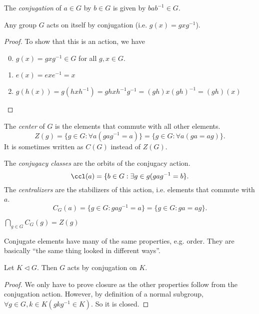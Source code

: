 \documentclass[a4pape]{article}
\begin{document}
\begin{defi}
  The \emph{conjugation} of $a\in G$ by $b\in G$ is given by $bab^{-1}\in G$.
\end{defi}

\begin{lemma}
  Any group $G$ acts on itself by conjugation (i.e. $g(x) = gxg^{-1}$).
\end{lemma}

\begin{proof}
  To show that this is an action, we have
  \begin{enumerate}[label=\arabic{*}.]
    \setcounter{enumi}{-1}
  \item $g(x) = gxg^{-1} \in G$ for all $g, x\in G$.
  \item $e(x) = exe^{-1} = x$
  \item $g(h(x)) = g(hxh^{-1}) = ghxh^{-1}g^{-1} = (gh)x(gh)^{-1} = (gh)(x)$
  \end{enumerate}
\end{proof}

\begin{defi}
  The \emph{center} of $G$ is the elements that commute with all other elements.
  \[
  Z(g) = \{g\in G: \forall a(gag^{-1} = a)\} = \{g\in G: \forall a(ga = ag)\}.
  \]
It is sometimes written as $C(G)$ instead of $Z(G)$.
\end{defi}

\begin{defi}
  The \emph{conjugacy classes} are the orbits of the conjugacy action.
  \[
  \ccl(a) = \{b\in G: \exists g\in g(gag^{-1} = b\}.
  \]
  The \emph{centralizers} are the stabilizers of this action, i.e. elements that commute with $a$.
  \[
  C_G(a) = \{g\in G: gag^{-1} = a\} = \{g\in G: ga = ag\}.
  \]
\end{defi}

\note $\bigcap_{g\in G} C_G(g) = Z(g)$

\note Conjugate elements have many of the same properties, e.g. order. They are basically ``the same thing looked in different ways''.

\begin{lemma}
  Let $K\lhd G$. Then $G$ acts by conjugation on $K$.
\end{lemma}

\begin{proof}
  We only have to prove closure as the other properties follow from the conjugation action. However, by definition of a normal subgroup, $\forall g\in G, k\in K(gkg^{-1}\in K)$.  So it is closed.
\end{proof}
\end{document}
